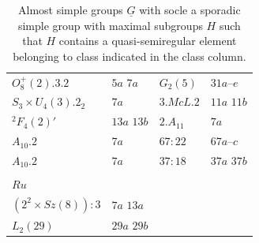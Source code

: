 \documentclass{article}
\theoremstyle{remark}
\theoremstyle{definition}
\newcommand{\qsre}{quasi-semiregular element}
\begin{document}
\begin{table}
\begin{tabular}{|l | l || l | l|}
$O_8^+(2).3.2$                  & $5a$ $7a$         & $G_2(5)$                             &  $31a$--$e$     \\
$S_3\times U_4(3).2_2$          & $7a$              & $3.McL.2$                           & $11a$ $11b$ \\
${}^2F_4(2)'$                     & $13a$ $13b$       & $2.A_{11}$                             & $7a$ \\
$A_{10}.2$                       & $7a$              & $67:22$                         & $67a$--$c$  \\
$A_{10}.2$                       & $7a$              & $37:18$                          & $37a$  $37b$  \\
                            &                   &                                   &  \\
\underline{$Ru$}                          &                   &                                   &  \\
$(2^2\times Sz(8)):3$         & $7a$ $13a$        &                                   &  \\
$L_2(29)$                      &  $29a$   $29b$    &                                   &  \\
\hline
\end{tabular}
    \caption{Almost simple groups $\underline{G}$  with socle a sporadic simple group with maximal subgroups $H$ such that $H$ contains a {\qsre} belonging to class indicated in the class column.}
    \label{tab:spor3}
\end{table}





\newpage
\end{document}

